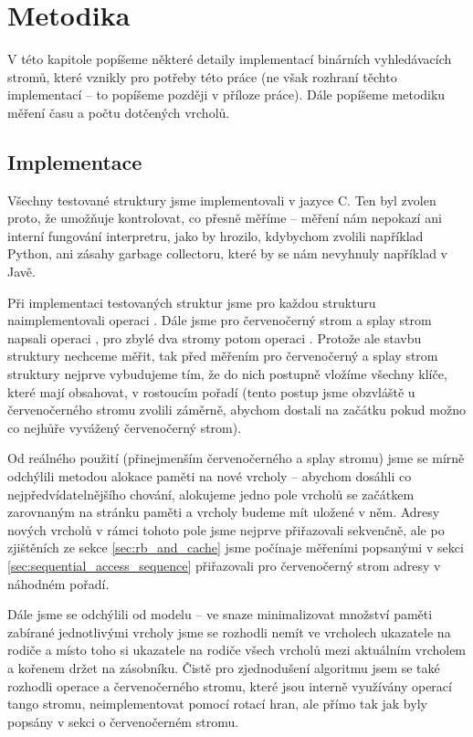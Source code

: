 \chapter{Metodika}

V této kapitole popíšeme některé detaily implementací binárních vyhledávacích stromů, které vznikly pro potřeby této práce (ne však rozhraní těchto implementací -- to popíšeme později v příloze práce). Dále popíšeme metodiku měření času a počtu dotčených vrcholů.

\section{Implementace}

Všechny testované struktury jsme implementovali v jazyce C. Ten byl zvolen
proto, že umožňuje kontrolovat, co přesně měříme -- měření nám nepokazí ani
interní fungování interpretru, jako by hrozilo, kdybychom zvolili například
Python, ani zásahy garbage collectoru, které by se nám nevyhnuly například v
Javě.

Při implementaci testovaných struktur jsme pro každou strukturu
naimplementovali operaci . Dále jsme pro červenočerný strom a splay
strom napsali operaci , pro zbylé dva stromy potom operaci
. Protože ale stavbu struktury nechceme měřit, tak před měřením pro
červenočerný a splay strom struktury nejprve vybudujeme tím, že do nich
postupně vložíme všechny klíče, které mají obsahovat, v rostoucím pořadí (tento postup jsme obzvláště u červenočerného stromu zvolili záměrně, abychom dostali na začátku pokud možno co nejhůře vyvážený červenočerný strom). 

Od reálného použití (přinejmenším červenočerného a splay stromu) jsme se mírně odchýlili metodou alokace paměti na nové vrcholy -- abychom dosáhli co nejpředvídatelnějšího chování, alokujeme jedno pole vrcholů se začátkem zarovnaným na stránku paměti a vrcholy budeme mít uložené v něm. Adresy nových vrcholů v rámci tohoto pole jsme nejprve přiřazovali sekvenčně, ale po zjištěních ze sekce \ref{sec:rb_and_cache} jsme počínaje měřeními popsanými v sekci \ref{sec:sequential_access_sequence} přiřazovali pro červenočerný strom adresy v náhodném pořadí. 

Dále jsme se odchýlili od modelu -- ve snaze minimalizovat množství paměti zabírané jednotlivými vrcholy jsme se rozhodli nemít ve vrcholech ukazatele na rodiče a místo toho si ukazatele na rodiče všech vrcholů mezi aktuálním vrcholem a kořenem držet na zásobníku. Čistě pro zjednodušení algoritmu jsem se také rozhodli operace  a  červenočerného stromu, které jsou interně využívány operací  tango stromu, neimplementovat pomocí rotací hran, ale přímo tak jak byly popsány v sekci o červenočerném stromu. 

